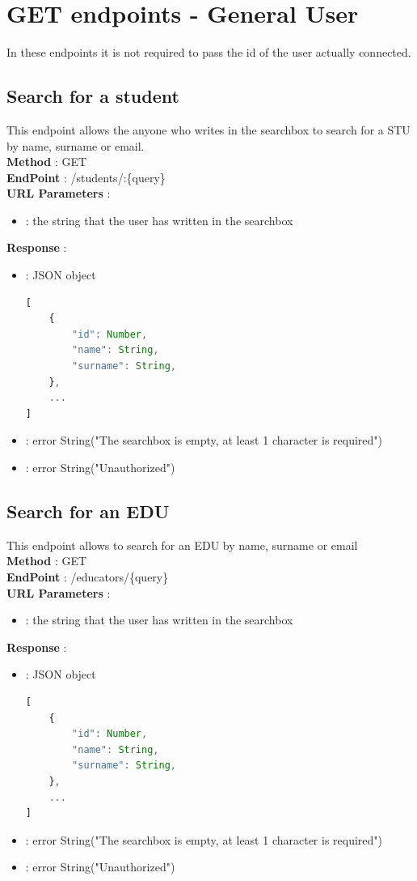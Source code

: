 \section*{GET endpoints - General User}
In these endpoints it is not required to pass the id of the user actually connected.
\subsection*{Search for a student}
This endpoint allows the anyone who writes in the searchbox to search for a STU by name, surname or email.\\
\textbf{Method} : GET \\
\textbf{EndPoint} : /students/:\{query\} \\
\textbf{URL Parameters} :
\begin{itemize}
    \item {} : the string that the user has written in the searchbox
\end{itemize}
\textbf{Response} :
\begin{itemize}
    \item {} : JSON object
          \begin{lstlisting}[language=JavaScript, label={lst:jscode}, basicstyle=\ttfamily]
[
    {
        "id": Number,
        "name": String,
        "surname": String,
    },
    ...
]
            \end{lstlisting}
    \item {} : error String("The searchbox is empty, at least 1 character is required")
    \item {} : error String("Unauthorized")
\end{itemize}


\subsection*{Search for an EDU}
This endpoint allows to search for an EDU by name, surname or email\\
\textbf{Method} : GET \\
\textbf{EndPoint} : /educators/\{query\}  \\
\textbf{URL Parameters} :
\begin{itemize}
    \item {} : the string that the user has written in the searchbox
\end{itemize}
\textbf{Response} :
\begin{itemize}
    \item {} : JSON object
          \begin{lstlisting}[language=JavaScript, label={lst:jscode}, basicstyle=\ttfamily]
[
    {
        "id": Number,
        "name": String,
        "surname": String,
    },
    ...
]
            \end{lstlisting}
    \item {} : error String("The searchbox is empty, at least 1 character is required")
    \item {} : error String("Unauthorized")
\end{itemize}

